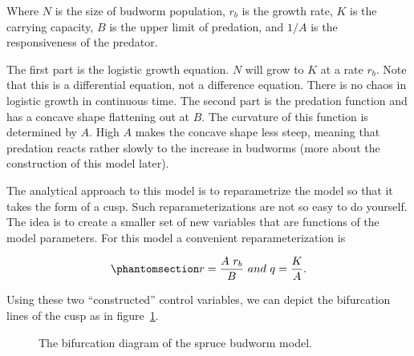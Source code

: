 \documentclass[
  a4paper,
  DIV=11,
  numbers=noendperiod,
  oneside]{scrreprt}
\begin{document}
Where \(N\) is the size of budworm population, \(r_{b}\) is the growth
rate, \(K\) is the carrying capacity, \(B\) is the upper limit of
predation, and \(1/A\) is the responsiveness of the predator.

The first part is the logistic growth equation. \(N\) will grow to \(K\)
at a rate \(r_{b}\). Note that this is a differential equation, not a
difference equation. There is no chaos in logistic growth in continuous
time. The second part is the predation function and has a concave shape
flattening out at \(B\). The curvature of this function is determined by
\(A\). High \(A\) makes the concave shape less steep, meaning that
predation reacts rather slowly to the increase in budworms (more about
the construction of this model later).

The analytical approach to this model is to reparametrize the model so
that it takes the form of a cusp. Such reparameterizations are not so
easy to do yourself. The idea is to create a smaller set of new
variables that are functions of the model parameters. For this model a
convenient reparameterization is

\begin{equation}\phantomsection\label{eq-ch3-8-old-12}{
r = \frac{A\ r_{b}}{B}\ and\ q = \frac{K}{A}.
}\end{equation}

Using these two ``constructed'' control variables, we can depict the
bifurcation lines of the cusp as in figure~\ref{fig-ch3-img16-old-28}.

\begin{figure}


\caption{\label{fig-ch3-img16-old-28}The bifurcation diagram of the
spruce budworm model.}

\end{figure}%
\end{document}
